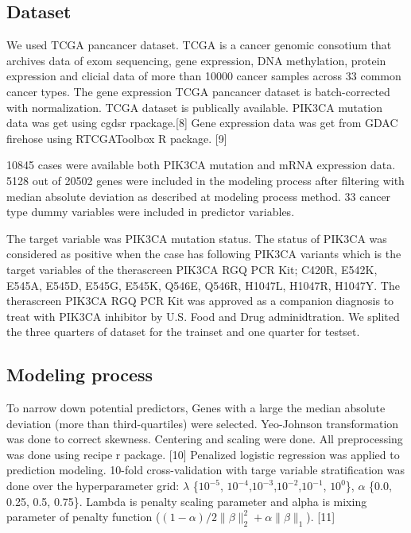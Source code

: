 \documentclass[10pt,letterpaper]{article}
\begin{document}
\hypertarget{dataset}{%
\subsection{Dataset}\label{dataset}}

We used TCGA pancancer dataset. TCGA is a cancer genomic consotium that
archives data of exom sequencing, gene expression, DNA methylation,
protein expression and clicial data of more than 10000 cancer samples
across 33 common cancer types. The gene expression TCGA pancancer
dataset is batch-corrected with normalization. TCGA dataset is
publically available. PIK3CA mutation data was get using cgdsr
rpackage.{[}8{]} Gene expression data was get from GDAC firehose using
RTCGAToolbox R package. {[}9{]}

10845 cases were available both PIK3CA mutation and mRNA expression
data. 5128 out of 20502 genes were included in the modeling process
after filtering with median absolute deviation as described at modeling
process method. 33 cancer type dummy variables were included in
predictor variables.

The target variable was PIK3CA mutation status. The status of PIK3CA was
considered as positive when the case has following PIK3CA variants which
is the target variables of the therascreen PIK3CA RGQ PCR Kit; C420R,
E542K, E545A, E545D, E545G, E545K, Q546E, Q546R, H1047L, H1047R, H1047Y.
The therascreen PIK3CA RGQ PCR Kit was approved as a companion diagnosis
to treat with PIK3CA inhibitor by U.S. Food and Drug adminidtration. We
splited the three quarters of dataset for the trainset and one quarter
for testset.

\hypertarget{modeling-process}{%
\subsection{Modeling process}\label{modeling-process}}

To narrow down potential predictors, Genes with a large the median
absolute deviation (more than third-quartiles) were selected.
Yeo-Johnson transformation was done to correct skewness. Centering and
scaling were done. All preprocessing was done using recipe r package.
{[}10{]} Penalized logistic regression was applied to prediction
modeling. 10-fold cross-validation with targe variable stratification
was done over the hyperparameter grid: \(\lambda\) \{\(10^{-5}\),
\(10^{-4}\),\(10^{-3}\),\(10^{-2}\),\(10^{-1}\), \(10^{0}\)\},
\(\alpha\) \{0.0, 0.25, 0.5, 0.75\}. Lambda is penalty scaling parameter
and alpha is mixing parameter of penalty function
(\((1-\alpha)/2 \lVert\beta\rVert_2^2+\alpha\lVert \beta \rVert_1\)).
{[}11{]}
\end{document}
